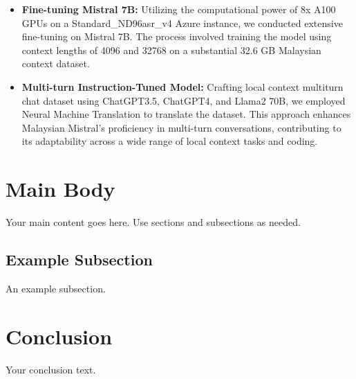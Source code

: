 \documentclass{article}
\begin{document}
\begin{itemize}
    \item \textbf{Fine-tuning Mistral 7B:} Utilizing the computational power of 8x A100 GPUs on a Standard\_ND96asr\_v4 Azure instance, we conducted extensive fine-tuning on Mistral 7B. The process involved training the model using context lengths of 4096 and 32768 on a substantial 32.6 GB Malaysian context dataset.

    \item \textbf{Multi-turn Instruction-Tuned Model:} Crafting local context multiturn chat dataset using ChatGPT3.5, ChatGPT4, and Llama2 70B, we employed Neural Machine Translation to translate the dataset. This approach enhances Malaysian Mistral's proficiency in multi-turn conversations, contributing to its adaptability across a wide range of local context tasks and coding.
\end{itemize}

\section{Main Body}
Your main content goes here. Use sections and subsections as needed.

\subsection{Example Subsection}
An example subsection.

\section{Conclusion}
Your conclusion text.

% 
% 
\end{document}
